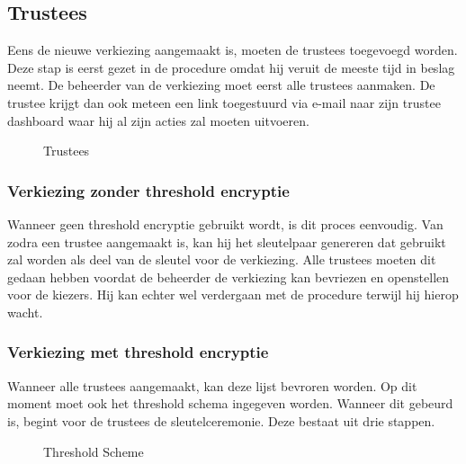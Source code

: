 \subsection{Trustees}


Eens de nieuwe verkiezing aangemaakt is, moeten de trustees toegevoegd worden. Deze stap is eerst gezet in de procedure omdat hij veruit de meeste tijd in beslag neemt. De beheerder van de verkiezing moet eerst alle trustees aanmaken. De trustee krijgt dan ook meteen een link toegestuurd via e-mail naar zijn trustee dashboard waar hij al zijn acties zal moeten uitvoeren.

\begin{figure}
  \caption{Trustees}
  \label{fig:proc:trustees_view}
\end{figure}

\subsubsection{Verkiezing zonder threshold encryptie}


Wanneer geen threshold encryptie gebruikt wordt, is dit proces eenvoudig. Van zodra een trustee aangemaakt is, kan hij het sleutelpaar genereren dat gebruikt zal worden als deel van de sleutel voor de verkiezing. Alle trustees moeten dit gedaan hebben voordat de beheerder de verkiezing kan bevriezen en openstellen voor de kiezers. Hij kan echter wel verdergaan met de procedure terwijl hij hierop wacht.

\subsubsection{Verkiezing met threshold encryptie}

\npar Wanneer alle trustees aangemaakt, kan deze lijst bevroren worden. Op dit moment moet ook het threshold schema ingegeven worden. Wanneer dit gebeurd is, begint voor de trustees de sleutelceremonie. Deze bestaat uit drie stappen.

\begin{figure}
  \caption{Threshold Scheme}
  \label{fig:proc:trustees_freeze}
\end{figure}


